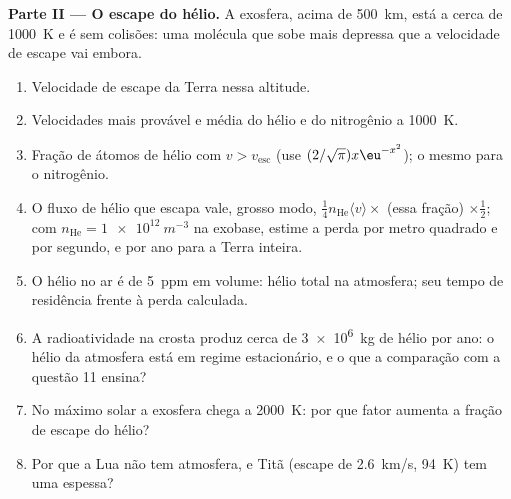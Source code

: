\begin{problem}
\textbf{Parte II --- O escape do hélio.}
A exosfera, acima de \qty{500}{km}, está a cerca de \qty{1000}{K} e é
sem colisões: uma molécula que sobe mais depressa que a velocidade de escape
vai embora.
\begin{enumerate}[resume]
  \item Velocidade de escape da Terra nessa altitude.
  \item Velocidades mais provável e média do hélio e do nitrogênio a
        \qty{1000}{K}.
  \item Fração de átomos de hélio com $v > v_{\text{esc}}$ (use
        $(2/\sqrt\pi)x\eu^{-x^2}$); o mesmo para o nitrogênio.
  \item O fluxo de hélio que escapa vale, grosso modo, $\tfrac14n_{\text{He}}\langle
        v\rangle \times$ (essa fração) $\times\tfrac12$; com $n_{\text{He}}
        = \qty{1e12}{m^{-3}}$ na exobase, estime a perda por metro
        quadrado e por segundo, e por ano para a Terra inteira.
  \item O hélio no ar é de \qty{5}{ppm} em volume: hélio total na
        atmosfera; seu tempo de residência frente à perda calculada.
  \item A radioatividade na crosta produz cerca de \qty{3e6}{kg} de hélio
        por ano: o hélio da atmosfera está em regime estacionário, e o que
        a comparação com a questão 11 ensina?
  \item No máximo solar a exosfera chega a \qty{2000}{K}: por que
        fator aumenta a fração de escape do hélio?
  \item Por que a Lua não tem atmosfera, e Titã (escape de
        \qty{2.6}{km/s}, \qty{94}{K}) tem uma espessa?
\end{enumerate}


\end{problem}
